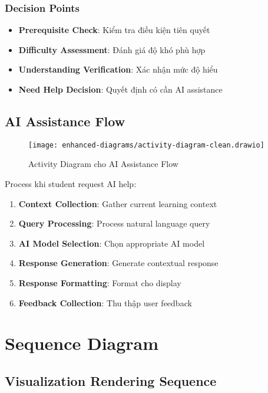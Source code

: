 \subsubsection{Decision Points}

\begin{itemize}
    \item \textbf{Prerequisite Check}: Kiểm tra điều kiện tiên quyết
    \item \textbf{Difficulty Assessment}: Đánh giá độ khó phù hợp
    \item \textbf{Understanding Verification}: Xác nhận mức độ hiểu
    \item \textbf{Need Help Decision}: Quyết định có cần AI assistance
\end{itemize}

\subsection{AI Assistance Flow}
\label{subsec:ai-flow}

\begin{figure}[H]
\centering
\texttt{[image: enhanced-diagrams/activity-diagram-clean.drawio]}
\caption{Activity Diagram cho AI Assistance Flow}
\label{fig:activity-ai}
\end{figure}

Process khi student request AI help:

\begin{enumerate}
    \item \textbf{Context Collection}: Gather current learning context
    \item \textbf{Query Processing}: Process natural language query
    \item \textbf{AI Model Selection}: Chọn appropriate AI model
    \item \textbf{Response Generation}: Generate contextual response
    \item \textbf{Response Formatting}: Format cho display
    \item \textbf{Feedback Collection}: Thu thập user feedback
\end{enumerate}

\section{Sequence Diagram}
\label{sec:sequence-diagram}

\subsection{Visualization Rendering Sequence}
\label{subsec:visualization-sequence}

